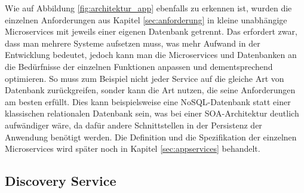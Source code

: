 Wie auf Abbildung \ref{fig:architektur_app} ebenfalls zu erkennen ist, wurden die einzelnen Anforderungen aus Kapitel \ref{sec:anforderung} in kleine unabhängige Microservices mit jeweils einer eigenen Datenbank getrennt. Das erfordert zwar, dass man mehrere Systeme aufsetzen muss, was mehr Aufwand in der Entwicklung bedeutet, jedoch kann man die Microservices und Datenbanken an die Bedürfnisse der einzelnen Funktionen anpassen und dementsprechend optimieren. So muss zum Beispiel nicht jeder Service auf die gleiche Art von Datenbank zurückgreifen, sonder kann die Art nutzen, die seine Anforderungen am besten erfüllt. Dies kann beispielsweise eine \ac{NoSQL}-Datenbank statt einer klassischen relationalen Datenbank sein, was bei einer \ac{SOA}-Architektur deutlich aufwändiger wäre, da dafür andere Schnittstellen in der Persistenz der Anwendung benötigt werden. Die Definition und die Spezifikation der einzelnen Microservices wird später noch in Kapitel \ref{sec:appservices} behandelt. 

\subsection*{Discovery Service\label{sec:discovery}}

